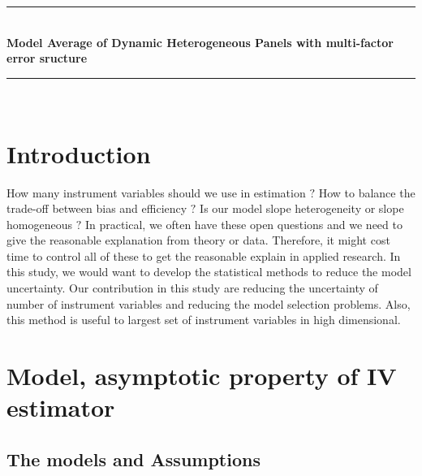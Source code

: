 \documentclass[12pt,a4paper,hyperref]{article}
\begin{document}
\begin{titlepage}

\newcommand{\HRule}{\rule{\linewidth}{0.5mm}} %

\center %



\HRule \\[0.4cm]
{ \huge \bfseries Model Average of Dynamic Heterogeneous Panels with multi-factor error sructure}\\[0.4cm] %
\HRule \\[1.5cm]


\vfill %

\end{titlepage}

\newpage
\tableofcontents
\newpage
\section{Introduction}
How many instrument variables should we use in estimation $?$ How to balance the trade-off between bias and efficiency $?$
Is our model slope heterogeneity or slope homogeneous $?$ In practical, we often have these open questions and we need to give the reasonable explanation from theory or data.
Therefore, it might cost time to control all of these to get the reasonable explain in applied research. In this study, we would want to develop the statistical  methods to reduce the model uncertainty.
Our contribution in this study are reducing the uncertainty of number of instrument variables and reducing the model selection problems. Also, this method is useful to largest set of instrument variables in high dimensional.






\section{Model, asymptotic property of IV estimator}
\subsection{The models and Assumptions}
\end{document}
